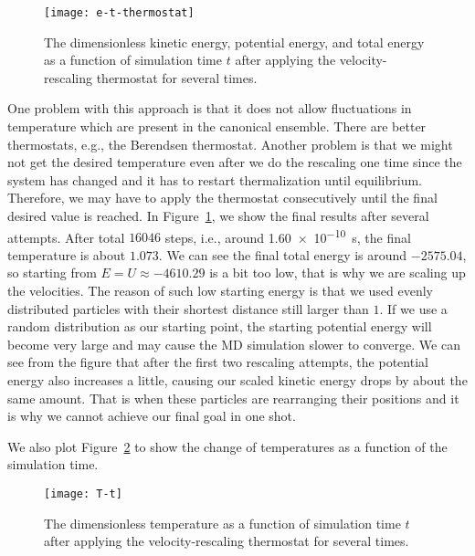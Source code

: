 \begin{figure}[H]
    \centering
    \texttt{[image: e-t-thermostat]}
    \caption{The dimensionless kinetic energy, potential energy, and total energy
        as a function of simulation time $t$ after applying the velocity-rescaling
        thermostat for several times.}
    \label{fig:md-thermostat}
\end{figure}

One problem with this approach is that it does not
allow fluctuations in temperature which are present in the canonical ensemble.
There are better thermostats, e.g., the Berendsen thermostat.
Another problem is that we might not get the desired temperature even after we do the
rescaling one time since the system has changed and it has to restart thermalization
until equilibrium. Therefore, we may have to apply the thermostat consecutively
until the final desired value is reached.
In Figure~\ref{fig:md-thermostat}, we show the final results after several attempts.
After total $16046$ steps, i.e., around \qty{1.60e-10}{\second}, the final temperature is
about $1.073$.
We can see the final total energy is around $-2575.04$, so starting from
$E = U \approx -4610.29$ is a bit too low, that is why we are scaling up the velocities.
The reason of such low starting energy is that we used evenly distributed particles
with their shortest distance still larger than $1$. If we use a random distribution
as our starting point, the starting potential energy will become very large and
may cause the MD simulation slower to converge.
We can see from the figure that after the first two rescaling attempts, the potential
energy also increases a little, causing our scaled kinetic energy drops by about the
same amount. That is when these particles are rearranging their positions and
it is why we cannot achieve our final goal in one shot.

We also plot Figure~\ref{fig:T-t} to show the change of temperatures as a function
of the simulation time.

\begin{figure}
    \centering
    \texttt{[image: T-t]}
    \caption{The dimensionless temperature as a function of simulation time $t$ after
        applying the velocity-rescaling thermostat for several times.}
    \label{fig:T-t}
\end{figure}
